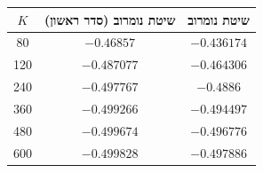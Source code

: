 \begin{tabular}{c c c}
$K$ & שיטת נומרוב (סדר ראשון) & שיטת נומרוב \\
\hline
80 & $-0.46857$ & $-0.436174$ \\
120 & $-0.487077$ & $-0.464306$ \\
240 & $-0.497767$ & $-0.4886$ \\
360 & $-0.499266$ & $-0.494497$ \\
480 & $-0.499674$ & $-0.496776$ \\
600 & $-0.499828$ & $-0.497886$ \\
\end{tabular}
